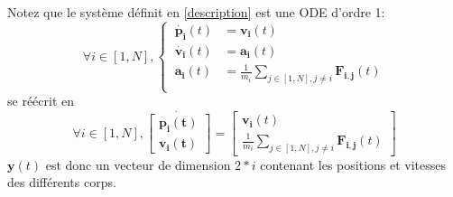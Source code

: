 \documentclass{article}
\newcommand{\myvec}[1]{\ensuremath{\mathbf{#1}}}
\begin{document}
\noindent Notez que le système définit en \ref{description} est une ODE d'ordre 1:
\begin{equation*}
    \forall i \in [1,N], \left\{\begin{aligned}
        \ \myvec{\dot{p_i}}(t) & = \myvec{v_i}(t) \\
        \ \myvec{\dot{v_i}}(t) & = \myvec{a_i}(t) \\
        \ \myvec{a_i}(t) & = \frac{1}{m_i} \sum_{j \in [1,N], j \ne i} \myvec{F_{i,j}}(t) \\
    \end{aligned}\right.
\end{equation*}
se réécrit en
\begin{equation*}
    \forall i \in [1,N], \myvec{\dot{\left[\begin{aligned}
        \myvec{p_i}(t) \\ \myvec{v_i}(t)
    \end{aligned}\right]}} =
    \left[\begin{gathered}
    \myvec{v_i}(t) \\ \frac{1}{m_i} \sum_{j \in [1,N], j \ne i} \myvec{F_{i,j}}(t)
    \end{gathered}\right]
\end{equation*}
$\myvec{y}(t)$ est donc un vecteur de dimension $2 * i$ contenant les positions et vitesses des différents corps.

\vspace{1em}
\end{document}
